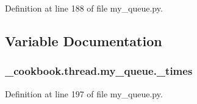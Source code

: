 Definition at line 188 of file my\-\_\-queue.\-py.



\subsection{Variable Documentation}
\hypertarget{namespace__cookbook_1_1thread_1_1my__queue_a2663f5c52855449734498ef4269f8e42}{
\subsubsection[{\-\_\-times}]{\setlength{\rightskip}{0pt plus 5cm}\-\_\-cookbook.\-thread.\-my\-\_\-queue.\-\_\-times}}\label{namespace__cookbook_1_1thread_1_1my__queue_a2663f5c52855449734498ef4269f8e42}


Definition at line 197 of file my\-\_\-queue.\-py.

